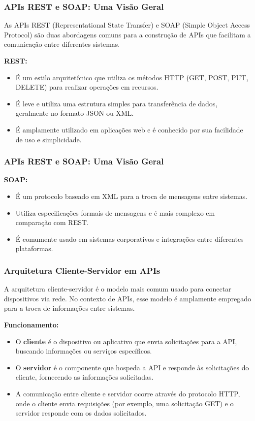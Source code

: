 \documentclass{beamer}
\begin{document}
\begin{frame}
	\frametitle{APIs REST e SOAP: Uma Visão Geral}

	As APIs REST (Representational State Transfer) e SOAP (Simple Object Access Protocol) são duas abordagens comuns para a construção de APIs que facilitam a comunicação entre diferentes sistemas.

	\textbf{REST:}
	\begin{itemize}
		\item É um estilo arquitetônico que utiliza os métodos HTTP (GET, POST, PUT, DELETE) para realizar operações em recursos.
		\item É leve e utiliza uma estrutura simples para transferência de dados, geralmente no formato JSON ou XML.
		\item É amplamente utilizado em aplicações web e é conhecido por sua facilidade de uso e simplicidade.
	\end{itemize}
\end{frame}

\begin{frame}
	\frametitle{APIs REST e SOAP: Uma Visão Geral}
	\textbf{SOAP:}
	\begin{itemize}
		\item É um protocolo baseado em XML para a troca de mensagens entre sistemas.
		\item Utiliza especificações formais de mensagens e é mais complexo em comparação com REST.
		\item É comumente usado em sistemas corporativos e integrações entre diferentes plataformas.
	\end{itemize}

\end{frame}

\begin{frame}
	\frametitle{Arquitetura Cliente-Servidor em APIs}

	A arquitetura cliente-servidor é o modelo mais comum usado para conectar dispositivos via rede. No contexto de APIs, esse modelo é amplamente empregado para a troca de informações entre sistemas.

	\textbf{Funcionamento:}
	\begin{itemize}
		\item O \textbf{cliente} é o dispositivo ou aplicativo que envia solicitações para a API, buscando informações ou serviços específicos.
		\item O \textbf{servidor} é o componente que hospeda a API e responde às solicitações do cliente, fornecendo as informações solicitadas.
		\item A comunicação entre cliente e servidor ocorre através do protocolo HTTP, onde o cliente envia requisições (por exemplo, uma solicitação GET) e o servidor responde com os dados solicitados.
	\end{itemize}


\end{frame}
\end{document}
